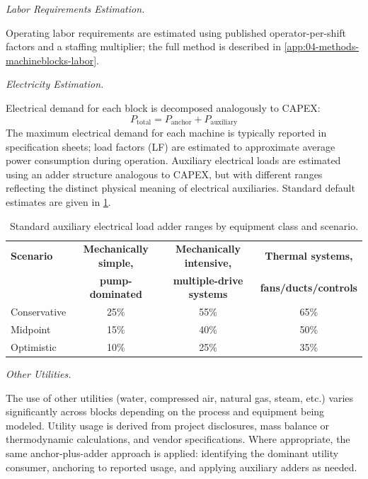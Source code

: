 \documentclass{article}
\renewcommand\_{\textunderscore\allowbreak}
\begin{document}
\medskip
\noindent\textit{Labor Requirements Estimation.}\quad

Operating labor requirements are estimated using published operator-per-shift factors
and a staffing multiplier; the full method is described in
\ref{app:04-methods-machineblocks-labor}.

\medskip
\noindent\textit{Electricity Estimation.}\quad

Electrical demand for each block is decomposed analogously to CAPEX:
\begin{equation}
    P_{\text{total}} = P_{\text{anchor}} + P_{\text{auxiliary}}
\end{equation}
The maximum electrical demand for each machine is typically reported in specification sheets; load factors (LF) are estimated to approximate average power consumption during operation. Auxiliary electrical loads are estimated using an adder structure analogous to CAPEX, but with different ranges reflecting the distinct physical meaning of electrical auxiliaries. Standard default estimates are given in \ref{tab:c-elec-adders}.

\begin{table}[h]
\caption{Standard auxiliary electrical load adder ranges by equipment class and scenario.}
\label{tab:c-elec-adders}
\begin{tabular}{lccc}
\hline
\textbf{Scenario} & \textbf{Mechanically simple,} & \textbf{Mechanically intensive,} & \textbf{Thermal systems,} \\
                  & \textbf{pump-dominated}       & \textbf{multiple-drive systems}  & \textbf{fans/ducts/controls} \\
\hline
Conservative & 25\% & 55\% & 65\% \\
Midpoint     & 15\% & 40\% & 50\% \\
Optimistic   & 10\% & 25\% & 35\% \\
\hline
\end{tabular}
\end{table}

\medskip
\noindent\textit{Other Utilities.}\quad

The use of other utilities (water, compressed air, natural gas, steam, etc.) varies significantly across blocks depending on the process and equipment being modeled. Utility usage is derived from project disclosures, mass balance or thermodynamic calculations, and vendor specifications. Where appropriate, the same anchor-plus-adder approach is applied: identifying the dominant utility consumer, anchoring to reported usage, and applying auxiliary adders as needed.
\end{document}

